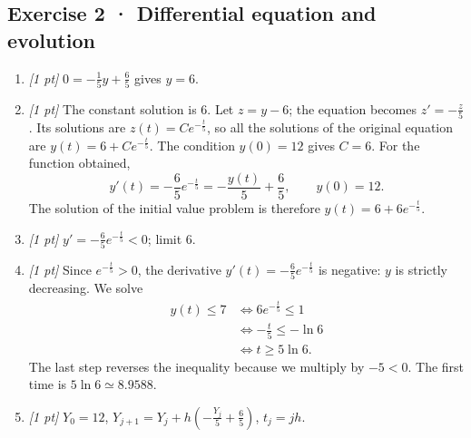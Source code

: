 \subsection*{Exercise 2 · Differential equation and evolution}\begin{enumerate}

\item \textit{[1 pt]} $0=-\frac{1}{5}y+\frac{6}{5}$ gives $y=6$.

\item \textit{[1 pt]} The constant solution is $6$. Let $z=y-6$; the equation becomes $z'=-\frac{z}{5}$. Its solutions are $z(t)=Ce^{-\frac{t}{5}}$, so all the solutions of the original equation are $y(t)=6+Ce^{-\frac{t}{5}}$.
The condition $y(0)=12$ gives $C=6$. For the function obtained,
\[y'(t)=-\frac{6}{5}e^{-\frac{t}{5}}=-\frac{y(t)}{5}+\frac{6}{5},\qquad y(0)=12.\]
The solution of the initial value problem is therefore $y(t)=6+6e^{-\frac{t}{5}}$.

\item \textit{[1 pt]} $y'=-\frac{6}{5}e^{-\frac{t}{5}}<0$; limit $6$.

\item \textit{[1 pt]} Since $e^{-\frac{t}{5}}>0$, the derivative $y'(t)=-\frac{6}{5}e^{-\frac{t}{5}}$ is negative: $y$ is strictly decreasing. We solve
\[\begin{aligned}y(t)\le 7&\Longleftrightarrow 6e^{-\frac{t}{5}}\le1\\&\Longleftrightarrow -\frac{t}{5}\le-\ln 6\\&\Longleftrightarrow t\ge 5\ln 6.\end{aligned}\]
The last step reverses the inequality because we multiply by $-5<0$. The first time is $5\ln 6\simeq8.9588$.

\item \textit{[1 pt]} $Y_0=12$, $Y_{j+1}=Y_j+h(-\frac{Y_j}{5}+\frac{6}{5})$, $t_j=jh$.

\end{enumerate}

